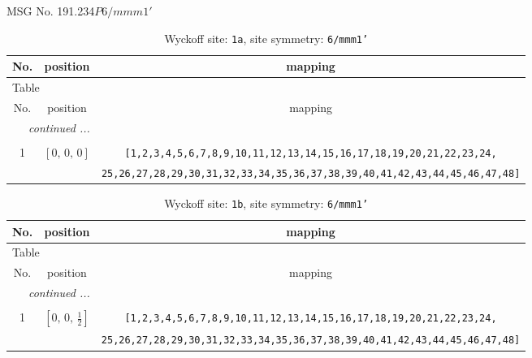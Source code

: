 \documentclass[fleqn,8pt]{jsarticle}
\begin{document}
\setcounter{MaxMatrixCols}{32}

\renewcommand{\tablename}{Table~}
\renewcommand{\figurename}{Figure~}
\begin{center}
\LARGE
MSG No. 191.234\quad$P6/mmm1'$
\end{center}
\renewcommand{\arraystretch}{1.2}
\begin{longtable}{ccc}
\caption{Wyckoff site: {\tt 1a}, site symmetry: {\tt 6/mmm1'}}
 \\
 \hline \hline
No. & position & mapping \\ \hline \endfirsthead

\multicolumn{2}{l}{\tablename\ \thetable{}} \\
 \hline \hline
No. & position & mapping \\ \hline \endhead

 \hline \hline
\multicolumn{2}{r}{\footnotesize\it continued ...} \\ \endfoot

 \hline \hline
\multicolumn{2}{r}{} \\ \endlastfoot

1 & $\left[ 0,\, 0,\, 0 \right]$ & {\tt [1,2,3,4,5,6,7,8,9,10,11,12,13,14,15,16,17,18,19,20,21,22,23,24,} \\ \hline
 &  & {\tt 25,26,27,28,29,30,31,32,33,34,35,36,37,38,39,40,41,42,43,44,45,46,47,48]} \\
\end{longtable}
\renewcommand{\arraystretch}{1.2}
\begin{longtable}{ccc}
\caption{Wyckoff site: {\tt 1b}, site symmetry: {\tt 6/mmm1'}}
 \\
 \hline \hline
No. & position & mapping \\ \hline \endfirsthead

\multicolumn{2}{l}{\tablename\ \thetable{}} \\
 \hline \hline
No. & position & mapping \\ \hline \endhead

 \hline \hline
\multicolumn{2}{r}{\footnotesize\it continued ...} \\ \endfoot

 \hline \hline
\multicolumn{2}{r}{} \\ \endlastfoot

1 & $\left[ 0,\, 0,\, \frac{1}{2} \right]$ & {\tt [1,2,3,4,5,6,7,8,9,10,11,12,13,14,15,16,17,18,19,20,21,22,23,24,} \\ \hline
 &  & {\tt 25,26,27,28,29,30,31,32,33,34,35,36,37,38,39,40,41,42,43,44,45,46,47,48]} \\
\end{longtable}
\end{document}
